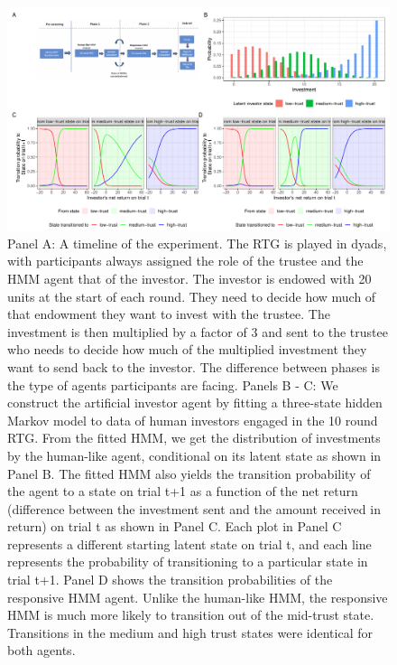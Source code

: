 \documentclass[
]{article}
\begin{document}
\begin{landscape}
\begin{figure}[htbp]
\centering
\includegraphics[width=\linewidth]{plots/figure1.pdf}
\caption{\small{Panel A: A timeline of the experiment. The RTG is played in dyads, with participants always assigned the role of the trustee and the HMM agent that of the investor. The investor is endowed with 20 units at the start of each round. They need to decide how much of that endowment they want to invest with the trustee. The investment is then multiplied by a factor of 3 and sent to the trustee who needs to decide how much of the multiplied investment they want to send back to the investor. The difference between phases is the type of agents participants are facing. Panels B - C: We construct the artificial investor agent by fitting a three-state hidden Markov model to data of human investors engaged in the 10 round RTG. From the fitted HMM, we get the distribution of investments by the human-like agent, conditional on its latent state as shown in Panel B. The fitted HMM also yields the transition probability of the agent to a state on trial t+1 as a function of the net return (difference between the investment sent and the amount received in return) on trial t as shown in Panel C. Each plot in Panel C represents a different starting latent state on trial t, and each line represents the probability of transitioning to a particular state in trial t+1. Panel D shows the transition probabilities of the responsive HMM agent. Unlike the human-like HMM, the responsive HMM is much more likely to transition out of the mid-trust state. Transitions in the medium and high trust states were identical for both agents.}}
\label{fig:combinedPlots}
\end{figure}
\end{landscape}
\end{document}
